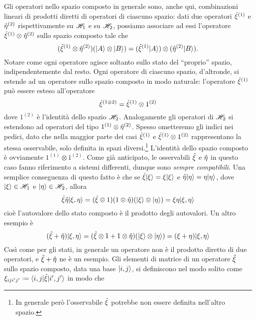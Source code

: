 Gli operatori nello spazio composto in generale sono, anche qui, combinazioni lineari di prodotti diretti di operatori di ciascuno spazio: dati due operatori $\hat{\xi}^{(1)}$ e $\hat{\eta}^{(2)}$ rispettivamente su $\mathscr H_1$ e su $\mathscr H_2$, possiamo associare ad essi l'operatore $\hat{\xi}^{(1)}\otimes\hat{\eta}^{(2)}$ sullo spazio composto tale che
\begin{equation}
	(\hat{\xi}^{(1)}\otimes\hat{\eta}^{(2)})(\lvert A\rangle\otimes\lvert B\rangle)=(\hat{\xi}^{(1)}\lvert A\rangle)\otimes(\hat{\eta}^{(2)}\lvert B\rangle).
\end{equation}
Notare come ogni operatore agisce soltanto sullo stato del ``proprio'' spazio, indipendentemente dal resto.
Ogni operatore di ciascuno spazio, d'altronde, si estende ad un operatore sullo spazio composto in modo naturale: l'operatore $\hat{\xi}^{(1)}$ può essere esteso all'operatore
\begin{equation}
	\hat{\xi}^{(1\otimes 2)}=\hat{\xi}^{(1)}\otimes 1^{(2)}
\end{equation}
dove $1^{(2)}$ è l'identità dello spazio $\mathscr H_2$.
Analogamente gli operatori di $\mathscr H_2$ si estendono ad operatori del tipo $1^{(1)}\otimes\hat{\eta}^{(2)}$.
Spesso ometteremo gli indici nei pedici, dato che nella maggior parte dei casi $\hat{\xi}^{(1)}$ e $\hat{\xi}^{(1)}\otimes 1^{(2)}$ rappresentano la stessa osservabile, solo definita in spazi diversi.\footnote{
	In generale però l'osservabile $\hat{\xi}$ potrebbe non essere definita nell'altro spazio.
}
L'identità dello spazio composto è ovviamente $1^{(1)}\otimes 1^{(2)}$.
Come già anticipato, le osservabili $\hat{\xi}$ e $\hat{\eta}$ in questo caso fanno riferimento a sistemi differenti, dunque sono \emph{sempre compatibili}.
Una semplice conseguenza di questo fatto è che se $\hat{\xi}\lvert\xi\rangle=\xi\lvert\xi\rangle$ e $\hat{\eta}\lvert\eta\rangle=\eta\lvert\eta\rangle$, dove $\lvert\xi\rangle\in\mathscr H_1$ e $\lvert\eta\rangle\in\mathscr H_2$, allora
\begin{equation}
	\hat{\xi}\hat{\eta}\lvert\xi,\eta\rangle=(\hat{\xi}\otimes 1)(1\otimes\hat{\eta})(\lvert\xi\rangle\otimes\lvert\eta\rangle)=\xi\eta\lvert\xi,\eta\rangle
\end{equation}
cioè l'autovalore dello stato composto è il prodotto degli autovalori.
Un altro esempio è
\begin{equation}
	(\hat{\xi}+\hat{\eta})\lvert\xi,\eta\rangle=(\hat{\xi}\otimes 1+1\otimes\hat{\eta})(\lvert\xi\rangle\otimes\lvert\eta\rangle)=(\xi+\eta)\lvert\xi,\eta\rangle
\end{equation}
Cos\`i come per gli stati, in generale un operatore non è il prodotto diretto di due operatori, e $\hat{\xi}+\hat{\eta}$ ne è un esempio.
Gli elementi di matrice di un operatore $\hat{\xi}$ sullo spazio composto, data una base $\lvert i,j\rangle$, si definiscono nel modo solito come $\xi_{iji'j'}\defeq\bra{i,j}\op\xi\ket{i',j'}$ in modo che
